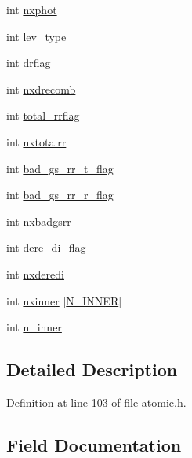 \begin{DoxyCompactItemize}
int \hyperlink{structions_a2eaa82b1ac409b1606fffb05e1a02e8a}{nxphot}
\item 
int \hyperlink{structions_a3898cfc092b91dab9a1586d50d6cf79c}{lev\+\_\+type}
\item 
int \hyperlink{structions_a62b2e0f93927161db3de868009d93d54}{drflag}
\item 
int \hyperlink{structions_a0fcf00a6c9d8d657dab3a74cdba9b32f}{nxdrecomb}
\item 
int \hyperlink{structions_a73b46d8ed6dd94e4d7cb4e45dada08d2}{total\+\_\+rrflag}
\item 
int \hyperlink{structions_a40ae093784ce3b98625c98cf3e75540c}{nxtotalrr}
\item 
int \hyperlink{structions_a64b486ba3811122938b85c5844cdb347}{bad\+\_\+gs\+\_\+rr\+\_\+t\+\_\+flag}
\item 
int \hyperlink{structions_ad2f21cfb8e5b55262cdede997b0d0d64}{bad\+\_\+gs\+\_\+rr\+\_\+r\+\_\+flag}
\item 
int \hyperlink{structions_ae31f2cb1312fef28e47a663fee995f39}{nxbadgsrr}
\item 
int \hyperlink{structions_a20a27292c31febcf63bf3e2f02f18dc3}{dere\+\_\+di\+\_\+flag}
\item 
int \hyperlink{structions_a21e7ca2eb457bdcd6e30c8f184f56bc4}{nxderedi}
\item 
int \hyperlink{structions_a2feb335d9e75a0effd5d2af9d83d6e72}{nxinner} \mbox{[}\hyperlink{atomic_8h_a075fa3e554e15e462b864cd9b40538f3}{N\+\_\+\+I\+N\+N\+ER}\mbox{]}
\item 
int \hyperlink{structions_ab0083547f8a577ed8c0edc66564827c8}{n\+\_\+inner}
\end{DoxyCompactItemize}


\subsection{Detailed Description}


Definition at line 103 of file atomic.\+h.



\subsection{Field Documentation}
\mbox{\label{structions_ad2f21cfb8e5b55262cdede997b0d0d64}} 
